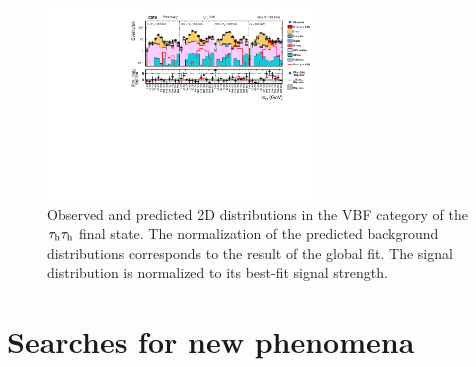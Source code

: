 \documentclass[10pt]{article}
\begin{document}
\begin{figure}[htb]
\centering
\includegraphics[height=2in]{figures/CMS-HIG-16-043__Figure_013__tauhtauh-VBF.pdf}
\caption{Observed and predicted 2D distributions in the VBF category of the
$\tau_{\rm h}\tau_{\rm h}$ final state. The normalization of the predicted
background distributions corresponds to the result of the global fit. The signal
distribution is normalized to its best-fit signal strength.
}
\label{fig:tauhtauh_VBF}
\end{figure}


\section{Searches for new phenomena}
\end{document}
